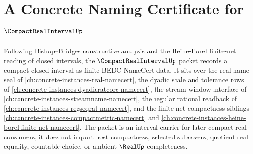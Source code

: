 \chapter{A Concrete Naming Certificate for $\CompactRealIntervalUp$}
\label{ch:concrete-instances-compact-real-interval-namecert}

Following Bishop--Bridges constructive analysis and the Heine-Borel finite-net reading of closed intervals, the $\CompactRealIntervalUp$ packet records a compact closed interval as finite BEDC NameCert data. It sits over the real-name seal of \autoref{ch:concrete-instances-real-namecert}, the dyadic scale and tolerance rows of \autoref{ch:concrete-instances-dyadicratcore-namecert}, the stream-window interface of \autoref{ch:concrete-instances-streamname-namecert}, the regular rational readback of \autoref{ch:concrete-instances-regseqrat-namecert}, and the finite-net compactness siblings \autoref{ch:concrete-instances-compactmetric-namecert} and \autoref{ch:concrete-instances-heine-borel-finite-net-namecert}. The packet is an interval carrier for later compact-real consumers; it does not import host compactness, selected subcovers, quotient real equality, countable choice, or ambient $\RealUp$ completeness.

